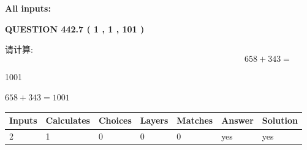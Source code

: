 \documentclass{ctexart}
\begin{document}
   
   
   
\noindent{}
   
   
   
   
\noindent\vspace{0.1in}\hspace{-0.08in} {\textbf{\Large{All inputs: }}}
   
   
  
\vspace{0.2in}
  
{\textbf{\Large{QUESTION
442.7 
 ( 1 , 1 , 101 )
}}}
  
  
 
请计算:
\begin{equation}
658 +  %
343 = \nonumber
\end{equation}
 
 
 
\noindent{}
 
 

1001
 
 
\noindent{}
 
 

 
 
 
\noindent{}
 
 

$ %
658 +  %
343=   %
1001$
 
 
\noindent{}
 
 

 
   
   
   
   
\noindent\begin{tabular}{|l|l|l|l|l|l|l|}
 \hline
Inputs & Calculates & Choices & Layers & Matches & Answer & Solution \\ \hline
 2  & 
 1  & 
 0
  & 
 0  & 
 0  & 
  yes & 
  yes 
  \\ \hline
 \end{tabular}
   
   
   
   
\noindent{}
   
\end{document}
